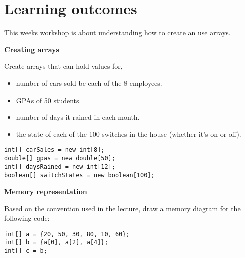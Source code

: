 

\section*{Learning outcomes}

This weeks workshop is about understanding how to create an use arrays.

\vspace{1em}
\begin{questions}

\question \textbf{Creating arrays}

Create arrays that can hold values for,

\begin{itemize}
  \item number of cars sold be each of the 8 employees.
  \item GPAs of 50 students.
  \item number of days it rained in each month.
  \item the state of each of the 100 switches in the house (whether it's on or off).
\end{itemize}
\ifprintanswers
\begin{lstlisting}
int[] carSales = new int[8];
double[] gpas = new double[50];
int[] daysRained = new int[12];
boolean[] switchStates = new boolean[100];
\end{lstlisting}
\else
\fi

\question \textbf{Memory representation}

Based on the convention used in the lecture, draw a memory diagram for the following code:

\begin{lstlisting}
int[] a = {20, 50, 30, 80, 10, 60};
int[] b = {a[0], a[2], a[4]};
int[] c = b;
\end{lstlisting}
\ifprintanswers
{}
\else
\fi


\end{questions}

